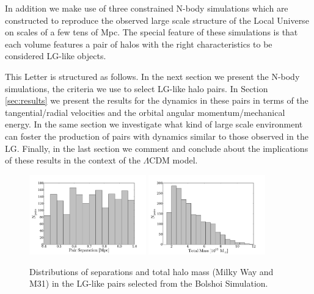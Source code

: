 \documentclass{emulateapj}
\begin{document}
In addition we make use of three 
constrained N-body simulations %
which are constructed to reproduce the observed large scale structure of the Local Universe on scales of a few tens of Mpc. The special feature of these simulations is that each volume features a pair of halos with the right 
characteristics to be considered 
LG-like objects.%

This Letter is structured as follows. In the next section we present the N-body simulations, the criteria we use to select LG-like halo pairs. 
In Section \ref{sec:results} we present the results for the dynamics in these pairs in terms of the tangential/radial velocities and the orbital angular momentum/mechanical energy. In the same section we investigate what kind of large scale environment can foster the production of pairs with dynamics similar to those observed in the LG. Finally, in the last section we comment and conclude about the implications of these results in the context of the $\Lambda$CDM model.





\label{subsec:lg-sample}
\begin{figure}
\begin{center}
\includegraphics[keepaspectratio=true,width=0.45\textwidth]{./figures/separation_BDM.pdf}
\includegraphics[keepaspectratio=true,width=0.45\textwidth]{./figures/total_mass_BDM.pdf}
\caption{\label{fig:distros} Distributions of separations and total halo mass (Milky Way and M31) in the LG-like pairs selected from the Bolshoi Simulation.}
\end{center}
\end{figure}
\end{document}
